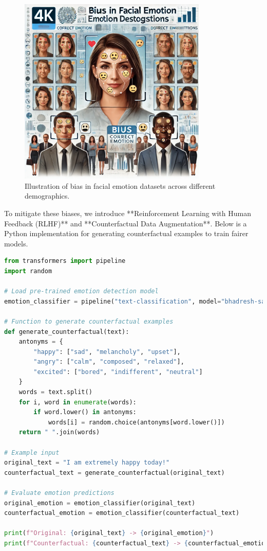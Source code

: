 \documentclass[a4paper,10pt]{article}
\begin{document}
\begin{figure}[h]
    \centering
    \includegraphics[width=0.8\textwidth]{img16.png}
    \caption{Illustration of bias in facial emotion datasets across different demographics.}
    \label{fig:bias}
\end{figure}

To mitigate these biases, we introduce **Reinforcement Learning with Human Feedback (RLHF)** and **Counterfactual Data Augmentation**. Below is a Python implementation for generating counterfactual examples to train fairer models.

\begin{lstlisting}[language=Python, caption=Counterfactual Data Augmentation for Fairness, label=lst:counterfactual, basicstyle=\ttfamily\footnotesize]
from transformers import pipeline
import random

# Load pre-trained emotion detection model
emotion_classifier = pipeline("text-classification", model="bhadresh-savani/distilbert-base-uncased-emotion")

# Function to generate counterfactual examples
def generate_counterfactual(text):
    antonyms = {
        "happy": ["sad", "melancholy", "upset"],
        "angry": ["calm", "composed", "relaxed"],
        "excited": ["bored", "indifferent", "neutral"]
    }
    words = text.split()
    for i, word in enumerate(words):
        if word.lower() in antonyms:
            words[i] = random.choice(antonyms[word.lower()])
    return " ".join(words)

# Example input
original_text = "I am extremely happy today!"
counterfactual_text = generate_counterfactual(original_text)

# Evaluate emotion predictions
original_emotion = emotion_classifier(original_text)
counterfactual_emotion = emotion_classifier(counterfactual_text)

print(f"Original: {original_text} -> {original_emotion}")
print(f"Counterfactual: {counterfactual_text} -> {counterfactual_emotion}")
\end{lstlisting}
\end{document}
